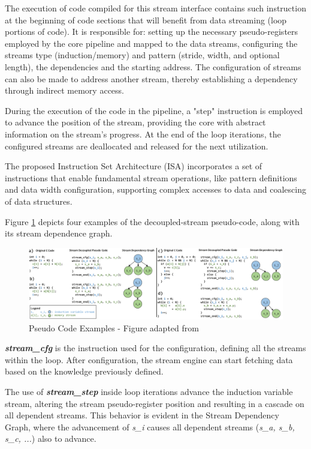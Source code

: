 The execution of code compiled for this stream interface contains such instruction at the beginning of code sections that will benefit from data streaming (loop portions of code). It is responsible for: setting up the necessary pseudo-registers employed by the core pipeline and mapped to the data streams, configuring the streams type (induction/memory) and pattern (stride, width, and optional length),  the dependencies and the starting address. The configuration of streams can also be made to address another stream, thereby establishing a dependency through indirect memory access.

During the execution of the code in the pipeline, a "step" instruction is employed to advance the position of the stream, providing the core with abstract information on the stream's progress. At the end of the loop iterations, the configured streams are deallocated and released for the next utilization.

The proposed Instruction Set Architecture (\acrshort{ISA}) incorporates a set of instructions that enable fundamental stream operations, like pattern definitions and data width configuration, supporting complex accesses to data and coalescing of data structures. 

Figure \ref{fig:SD_execution} depicts four examples of the decoupled-stream pseudo-code, along with its stream dependence graph.

\begin{figure}[H]
\begin{center}
\includegraphics[width=0.97\linewidth]{images/SD_execution.pdf}
\caption{Pseudo Code Examples - Figure adapted from \cite{8980305}}
\label{fig:SD_execution}
\end{center}
\end{figure}

\textbf{\textit{stream\_cfg}} is the instruction used for the configuration, defining all the streams within the loop. After configuration, the stream engine can start fetching data based on the knowledge previously defined.

The use of \textbf{\textit{stream\_step}} inside loop iterations advance the induction variable stream, altering the stream pseudo-register position and resulting in a cascade on all dependent streams. This behavior is evident in the Stream Dependency Graph, where the advancement of \textit{s\_i} causes all dependent streams (\textit{s\_a, s\_b, s\_c, ...}) also to advance.

